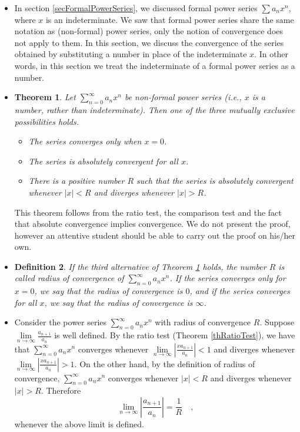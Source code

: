 \documentclass[12pt]{book}
\newtheorem{theorem}{Theorem}[section]
\newtheorem{definition}[theorem]{Definition}
\begin{document}
\begin{itemize}
\item In section \ref{secFormalPowerSeries}, we discussed formal power series $\sum a_n x^n$, where $x$ is an indeterminate. We saw that formal power series share the same notation as (non-formal) power series, only the notion of convergence does not apply to them. In this section, we discuss the convergence of the series obtained by substituting a number in place of the indeterminate $x$. In other words, in this section we treat the indeterminate of a formal power series as a number.
\item 
\begin{theorem}\label{thRadiusConvergence} Let $\sum\limits_{n=0}^\infty a_n x^n$ be non-formal power series (i.e., $x$ is a number, rather than indeterminate). Then one of the three mutually exclusive possibilities holds.
\begin{itemize}
\item The series converges only when $x=0$.
\item The series is absolutely convergent for all $x$.
\item There is a positive number $R$ such that the series is absolutely convergent whenever $|x|<R$ and diverges whenever $|x|>R$.
\end{itemize}
\end{theorem}
This theorem follows from the ratio test, the comparison test and the fact that absolute convergence implies convergence. We do not present the proof, however an attentive student should be able to carry out the proof on his/her own.
\item 
\begin{definition}\label{defRadiusConvergence} 
If the third alternative of Theorem \ref{thRadiusConvergence} holds, the number $R$ is called \emph{radius of convergence} of $\sum\limits_{n=0}^\infty a_n x^n$. If the series converges only for $x=0$, we say that the radius of convergence is $0$, and if the series converges for all $x$, we say that the radius of convergence is $\infty$.
\end{definition}

\item Consider the power series $\sum\limits_{n=0}^\infty a_n x^n$ with radius of convergence $R$.  Suppose $\lim\limits_{n\to\infty} \frac{a_{n+1}}{a_n}$ is well defined. By the ratio test (Theorem \ref{thRatioTest}), we have that  $\sum\limits_{n=0}^\infty a_n x^n$ converges whenever $\lim\limits_{n\to\infty} \left|\frac{xa_{n+1}}{a_n}\right|<1$ and diverges whenever $\lim\limits_{n\to\infty} \left|\frac{xa_{n+1}}{a_n}\right|>1$. On the other hand, by the definition of radius of convergence, $\sum\limits_{n=0}^\infty a_n x^n$ converges whenever $|x|<R$ and diverges whenever $|x|>R$. Therefore 
\[
\lim\limits_{n\to\infty} \left|\frac{a_{n+1}}{a_n}\right|=\frac{1}{R}\quad,
\]
whenever the above limit is defined.
 

\end{itemize}
\end{document}
